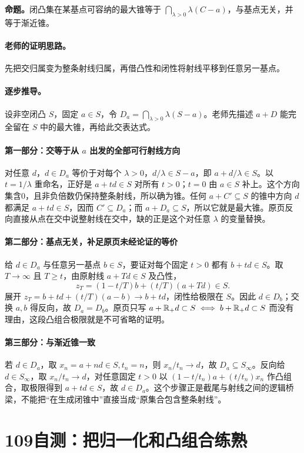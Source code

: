 \textbf{命题。}闭凸集在某基点可容纳的最大锥等于 $\bigcap_{\lambda>0}\lambda(C-a)$，与基点无关，并等于渐近锥。

\paragraph{老师的证明思路。}先把交归属变为整条射线归属，再借凸性和闭性将射线平移到任意另一基点。

\paragraph{逐步推导。}
设非空闭凸 $S$，固定 $a\in S$，令 $D_a=\bigcap_{\lambda>0}\lambda(S-a)$。老师先描述 $a+D$ 能完全留在 $S$ 中的最大锥，再给此交表达式。
\paragraph{第一部分：交等于从 $a$ 出发的全部可行射线方向}
对任意 $d$，$d\in D_a$ 等价于对每个 $\lambda>0$，$d/\lambda\in S-a$，即 $a+d/\lambda\in S$。以 $t=1/\lambda$ 重命名，正好是 $a+td\in S$ 对所有 $t>0$；$t=0$ 由 $a\in S$ 补上。这个方向集含0，且非负倍数仍保持整条射线，所以确为锥。任何 $a+C'\subseteq S$ 的锥中方向 $d$ 都满足 $a+td\in S$，因而 $C'\subseteq D_a$；而 $a+D_a\subseteq S$，所以它就是最大锥。原页反向直接从点在交中说整射线在交中，缺的正是这个对任意 $\lambda$ 的变量替换。
\paragraph{第二部分：基点无关，补足原页未经论证的等价}
给 $d\in D_a$ 与任意另一基点 $b\in S$，要证对每个固定 $t>0$ 都有 $b+td\in S$。取 $T\to\infty$ 且 $T\ge t$，由原射线 $a+Td\in S$ 及凸性，
\[z_T=(1-t/T)b+(t/T)(a+Td)\in S.\]
展开 $z_T=b+td+(t/T)(a-b)\to b+td$，闭性给极限在 $S$。因此 $d\in D_b$；交换 $a,b$ 得反向，故 $D_a=D_b$。原页只写 $a+\mathbb{R}_+d\subset S\iff b+\mathbb{R}_+d\subset S$ 而没有理由，这段凸组合极限就是不可省略的证明。
\paragraph{第三部分：与渐近锥一致}
若 $d\in D_a$，取 $x_n=a+nd\in S,t_n=n$，则 $x_n/t_n\to d$，故 $D_a\subseteq S_\infty$。反向给 $d\in S_\infty$，取 $x_n/t_n\to d$，对任意固定 $t>0$ 以 $(1-t/t_n)a+(t/t_n)x_n$ 作凸组合，取极限得到 $a+td\in S$，故 $d\in D_a$。这个步骤正是截尾与射线之间的逻辑桥梁，不能把“在生成闭锥中”直接当成“原集合包含整条射线”。


\clearpage\section{109自测：把归一化和凸组合练熟}
